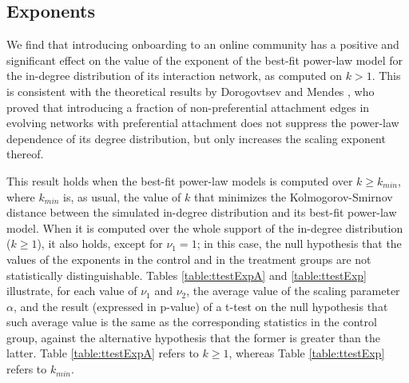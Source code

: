\documentclass{article}
\begin{document}
\subsection{Exponents} \label{ssec:exponents}
We find that introducing onboarding to an online community has a positive and significant effect on the value of the exponent of the best-fit power-law model for the in-degree distribution of its interaction network, as computed on $k > 1$. This is consistent with the theoretical results by Dorogovtsev and Mendes \cite{dorogovtsev2002evolution}, who proved that introducing a fraction of non-preferential attachment edges in evolving networks with preferential attachment does not suppress the power-law dependence of its degree distribution, but only increases the scaling exponent thereof. 

This result holds when the best-fit power-law models is computed over $k \geq k_{min}$, where $k_{min}$ is, as usual, the value of $k$ that minimizes the Kolmogorov-Smirnov distance between the simulated in-degree distribution and its best-fit power-law model. When it is computed over the whole support of the in-degree distribution ($k \geq  1$), it also holds, except for $\nu_1 = 1$; in this case, the null hypothesis that the values of the exponents in the control and in the treatment groups are not statistically distinguishable. Tables \ref {table:ttestExpA} and \ref {table:ttestExp} illustrate, for each value of  $\nu_1$ and $\nu_2$, the average value of the scaling parameter $\alpha$, and the result (expressed in p-value) of a t-test on the null hypothesis that such average value is the same as the corresponding statistics in the control group, against the alternative hypothesis that the former is greater than the latter. Table \ref{table:ttestExpA} refers to $k \geq  1$, whereas Table \ref{table:ttestExp} refers to $k_{min}$.
\end{document}
